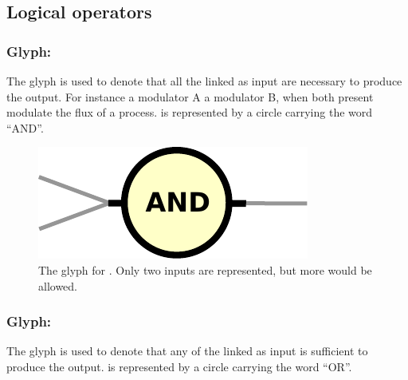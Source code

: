 
\subsection{Logical operators}\label{sec:logic}

\subsubsection{Glyph: }\label{sec:and}

The glyph  is used to denote that all the  linked as input are necessary to produce the output. For instance a modulator A  a modulator B, when both present modulate the flux of a process.  is represented by a circle carrying the word ``AND''.

\begin{figure}[H]
  \centering
  \includegraphics[scale = 0.5]{le_images/and}
  \caption{The \PD glyph for . Only two inputs are represented, but more would be allowed.}
  \label{fig:and}
\end{figure}

\subsubsection{Glyph: }\label{sec:or}

The glyph  is used to denote that any of the  linked as input is sufficient to produce the output.  is represented by a circle carrying the word ``OR''.


